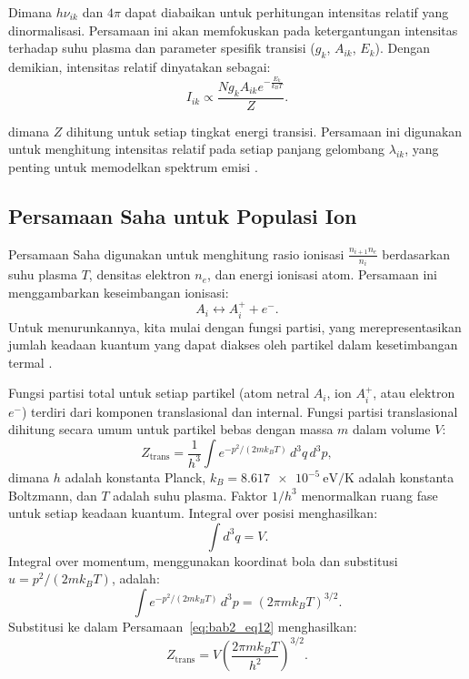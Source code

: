 Dimana \( h \nu_{ik} \) dan \( 4\pi \) dapat diabaikan untuk perhitungan intensitas relatif yang dinormalisasi. Persamaan ini akan memfokuskan pada ketergantungan intensitas terhadap suhu plasma dan parameter spesifik transisi (\( g_k \), \( A_{ik} \), \( E_k \)). Dengan demikian, intensitas relatif dinyatakan sebagai:
\begin{equation}
I_{ik} \propto \frac{N g_k A_{ik} e^{-\frac{E_k}{k_B T}}}{Z}. \label{eq:bab2_eq11}
\end{equation}

dimana \( Z \) dihitung untuk setiap tingkat energi transisi. Persamaan ini digunakan untuk menghitung intensitas relatif pada setiap panjang gelombang \( \lambda_{ik} \), yang penting untuk memodelkan spektrum emisi \citep{Rybicki1985,Draine2011,Mason2015}.

\subsection{Persamaan Saha untuk Populasi Ion}

Persamaan Saha digunakan untuk menghitung rasio ionisasi \( \frac{n_{i+1} n_e}{n_i} \) berdasarkan suhu plasma \( T \), densitas elektron \( n_e \), dan energi ionisasi atom. Persamaan ini menggambarkan keseimbangan ionisasi:
\[
A_i \leftrightarrow A_i^+ + e^-.
\]
Untuk menurunkannya, kita mulai dengan fungsi partisi, yang merepresentasikan jumlah keadaan kuantum yang dapat diakses oleh partikel dalam kesetimbangan termal \citep{Pathria2011}.

Fungsi partisi total untuk setiap partikel (atom netral \( A_i \), ion \( A_i^+ \), atau elektron \( e^- \)) terdiri dari komponen translasional dan internal. Fungsi partisi translasional dihitung secara umum untuk partikel bebas dengan massa \( m \) dalam volume \( V \):
\begin{equation}
Z_{\text{trans}} = \frac{1}{h^3} \int e^{-p^2/(2m k_B T)} \, d^3q \, d^3p, \label{eq:bab2_eq12}
\end{equation}
dimana \( h \) adalah konstanta Planck, \( k_B = \SI{8.617e-5}{\electronvolt\per\kelvin} \) adalah konstanta Boltzmann, dan \( T \) adalah suhu plasma. Faktor \( 1/h^3 \) menormalkan ruang fase untuk setiap keadaan kuantum. Integral over posisi menghasilkan:
\begin{equation}
\int d^3q = V. \label{eq:bab2_eq13}
\end{equation}
Integral over momentum, menggunakan koordinat bola dan substitusi \( u = p^2/(2m k_B T) \), adalah:
\begin{equation}
\int e^{-p^2/(2m k_B T)} \, d^3p = \left( 2\pi m k_B T \right)^{3/2}. \label{eq:bab2_eq14}
\end{equation}
Substitusi ke dalam Persamaan~\eqref{eq:bab2_eq12} menghasilkan:
\begin{equation}
Z_{\text{trans}} = V \left( \frac{2\pi m k_B T}{h^2} \right)^{3/2}. \label{eq:bab2_eq15}
\end{equation}

